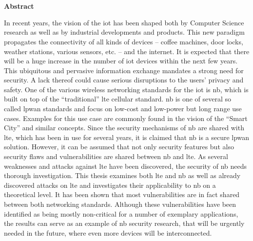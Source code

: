 \begin{otherlanguage}{ngerman}
\end{otherlanguage}
\acresetall

\cleardoublepage
\chapter*{\ }
\acresetall

\begin{center}
	\begin{large}
		\textbf{Abstract}
	\end{large}
\end{center}
\vspace{0.75em}


In recent years, the vision of the \ac{iot} has been shaped both by Computer Science research as well as by industrial developments and products.
This new paradigm propagates the connectivity of all kinds of devices -- coffee machines, door locks, weather stations, various sensors, etc. --  and the internet.
It is expected that there will be a huge increase in the number of \ac{iot} devices within the next few years.
This ubiquitous and pervasive information exchange mandates a strong need for security.
A lack thereof could cause serious disruptions to the users' privacy and safety.
One of the various wireless networking standards for the \ac{iot} is \ac{nb}, which is built on top of the \enquote{traditional} \ac{lte} cellular standard.
\ac{nb}  is one of several so called \ac{lpwan} standards and focus on low-cost and low-power but long range use cases.
Examples for this use case are commonly found in the vision of the \enquote{Smart City} and similar concepts.
Since the security mechanisms of \ac{nb} are shared with \ac{lte}, which has been in use for several years, it is claimed that \ac{nb} is a secure \ac{lpwan} solution.
However, it can be assumed that not only security features but also security flaws and vulnerabilities are shared between \ac{nb} and \ac{lte}.
As several weaknesses and attacks against \ac{lte} have been discovered, the security of \ac{nb} needs thorough investigation.
This thesis examines both \ac{lte} and \ac{nb} as well as already discovered attacks on \ac{lte} and investigates their applicability to \ac{nb} on a theoretical level.
It has been shown that most vulnerabilities are in fact  shared between both networking standards.
Although these vulnerabilities have been identified as being mostly non-critical for a number of exemplary applications, the results can serve as an example of \ac{nb} security research, that will be urgently needed in the future, where even more devices will be interconnected.
\acresetall

